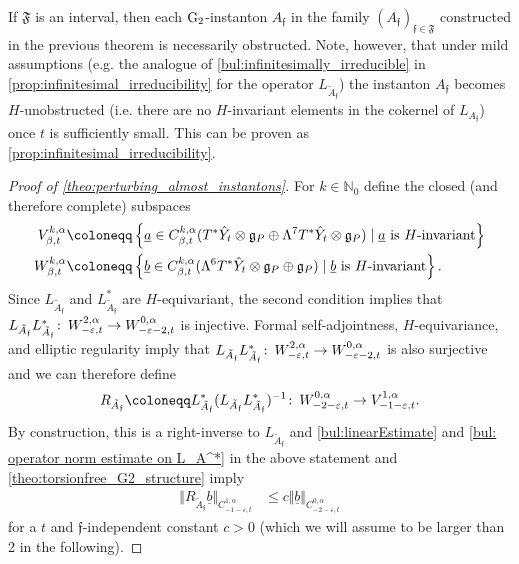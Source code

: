 \documentclass[11pt,a4paper]{scrartcl}
\newcommand{\col}{\colon \thinspace}
\newcommand{\VertWHt}[3]{\Vert_{C^{{#1},\alpha}_{{#2},t}{#3}}}
\newcommand{\G}{\textup{G}}
\numberwithin{equation}{section}
\theoremstyle{plain}
\theoremstyle{definition}
\theoremstyle{remark}
\begin{document}
\begin{remark}
If $\mathfrak{F}$ is an interval, then each $\G_2$-instanton $A_\mathfrak{f}$ in the family $(A_\mathfrak{f})_{\mathfrak{f}\in \mathfrak{F}}$ constructed in the previous theorem is necessarily obstructed. Note, however, that under mild assumptions (e.g. the analogue of \autoref{bul:infinitesimally_irreducible} in \autoref{prop:infinitesimal_irreducibility} for the operator $L_{\tilde{A}_{\mathfrak{f}}}$) the instanton $A_\mathfrak{f}$ becomes $H$-unobstructed (i.e. there are no $H$-invariant elements in the cokernel of $L_{A_\mathfrak{f}}$) once $t$ is sufficiently small. This can be proven as \autoref{prop:infinitesimal_irreducibility}.
\end{remark}
\begin{proof}[Proof of \autoref{theo:perturbing_almost_instantons}]
For $k\in \mathbb{N}_0$ define the closed (and therefore complete) subspaces 
\begin{align*}
V^{k,\alpha}_{\beta,t} &\coloneqq \left\{ \underline{a} \in C^{k,\alpha}_{\beta,t}(T^*\hat{Y}_t\otimes\mathfrak{g}_P\oplus \Lambda^7T^*\hat{Y}_t \otimes \mathfrak{g}_P) \mid \textup{$\underline{a}$ is $H$-invariant}\right\} \\
W^{k,\alpha}_{\beta,t} &\coloneqq \left\{ \underline{b} \in C^{k,\alpha}_{\beta,t}(\Lambda^6T^*\hat{Y}_t\otimes \mathfrak{g}_P\oplus \mathfrak{g}_P) \mid \textup{$\underline{b}$ is $H$-invariant}\right\}. 
\end{align*} 
Since $L_{\tilde{A}_{\mathfrak{f}}}$ and $L_{\tilde{A}_{\mathfrak{f}}}^*$ are $H$-equivariant, the second condition implies that $L_{\tilde{A}_{\mathfrak{f}}}L_{\tilde{A}_{\mathfrak{f}}}^* \col W^{2,\alpha}_{-\varepsilon,t} \to W^{0,\alpha}_{-\varepsilon-2,t}$ is injective. Formal self-adjointness, $H$-equivariance, and elliptic regularity imply that $L_{\tilde{A}_{\mathfrak{f}}}L_{\tilde{A}_{\mathfrak{f}}}^* \col W^{2,\alpha}_{-\varepsilon,t} \to W^{0,\alpha}_{-\varepsilon-2,t}$ is also surjective and we can therefore define \[R_{\tilde{A}_{\mathfrak{f}}} \coloneqq L_{\tilde{A}_{\mathfrak{f}}}^*(L_{\tilde{A}_{\mathfrak{f}}}L_{\tilde{A}_{\mathfrak{f}}}^*)^{-1} \col W^{0,\alpha}_{-2-\varepsilon,t} \to V^{1,\alpha}_{-1-\varepsilon,t}. \] By construction, this is a right-inverse to $L_{\tilde{A}_{\mathfrak{f}}}$ and \autoref{bul:linearEstimate} and \autoref{bul: operator norm estimate on L_A^*} in the above statement and \autoref{theo:torsionfree_G2_structure} imply
\begin{align}\label{eq: estimate right-inverse}
\Vert R_{\tilde{A}_{\mathfrak{f}}} \underline{b} \VertWHt{1}{-1-\varepsilon}{} & \leq c \Vert \underline{b}\VertWHt{0}{-2-\varepsilon}{}
\end{align}
for a $t$ and $\mathfrak{f}$-independent constant $c>0$ (which we will assume to be larger than 2 in the following).


\end{proof}
\end{document}
